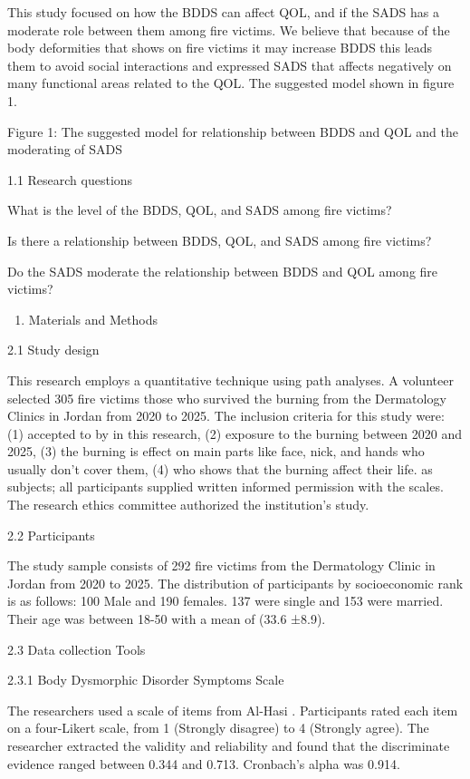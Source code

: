 \documentclass[10pt]{NSP1}
\begin{document}
This study focused on how the BDDS can affect QOL, and if the SADS has a moderate role between them among fire victims. We believe that because of the body deformities that shows on fire victims it may increase BDDS this leads them to avoid social interactions and expressed SADS that affects negatively on many functional areas related to the QOL. The suggested model shown in figure 1.

Figure 1: The suggested model for relationship between BDDS and QOL and the moderating of SADS

1.1 Research questions

What is the level of the BDDS, QOL, and SADS among fire victims?

Is there a relationship between BDDS, QOL, and SADS among fire victims?

Do the SADS moderate the relationship between BDDS and QOL among fire victims?

\begin{enumerate}
  \item Materials and Methods
\end{enumerate}

2.1 Study design

This research employs a quantitative technique using path analyses. A volunteer selected 305 fire victims those who survived the burning from the Dermatology Clinics in Jordan from 2020 to 2025. The inclusion criteria for this study were: (1) accepted to by in this research, (2) exposure to the burning between 2020 and 2025, (3) the burning is effect on main parts like face, nick, and hands who usually don’t cover them, (4) who shows that the burning affect their life. as subjects; all participants supplied written informed permission with the scales. The research ethics committee authorized the institution’s study.

2.2 Participants

The study sample consists of 292 fire victims from the Dermatology Clinic in Jordan from 2020 to 2025. The distribution of participants by socioeconomic rank is as follows: 100 Male and 190 females. 137 were single and 153 were married. Their age was between 18-50 with a mean of (33.6 ±8.9).

2.3 Data collection Tools

2.3.1 Body Dysmorphic Disorder Symptoms Scale

The researchers used a scale of  items from Al-Hasi . Participants rated each item on a four-Likert scale, from 1 (Strongly disagree) to 4 (Strongly agree). The researcher extracted the validity and reliability and found that the discriminate evidence ranged between 0.344 and 0.713. Cronbach’s alpha was 0.914.
\end{document}
